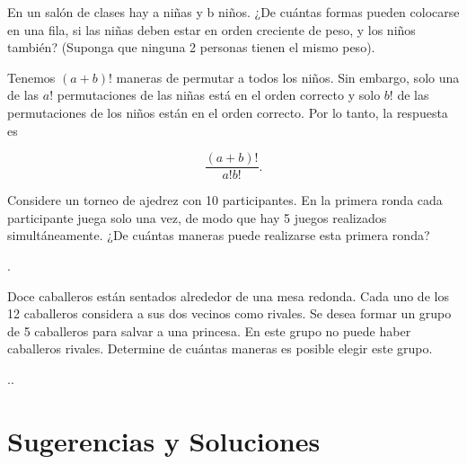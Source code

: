 \documentclass[11pt]{scrartcl}
\begin{document}
\begin{problem}
En un salón de clases hay a niñas y b niños. ¿De cuántas formas pueden colocarse en una fila, si las niñas deben estar en orden creciente de peso, y los niños también? (Suponga que ninguna 2 personas tienen el mismo peso).
\begin{hint}
Tenemos $(a + b)!$ maneras de permutar a todos los niños. Sin embargo, solo una de las $a!$ permutaciones de las niñas está en el orden correcto y solo $b!$ de las permutaciones de los niños están en el orden correcto. Por lo tanto, la respuesta es

\[
\frac{(a + b)!}{a!b!}.
\]

\end{hint}
\end{problem}

\begin{problem}
Considere un torneo de ajedrez con 10 participantes. En la primera ronda cada participante juega solo una vez, de modo que hay 5 juegos realizados simultáneamente. ¿De cuántas maneras puede realizarse esta primera ronda?
\begin{hint}
.
\end{hint}
\end{problem}

\begin{problem}
Doce caballeros están sentados alrededor de una mesa redonda. Cada uno de los 12 caballeros considera a sus dos vecinos como rivales. Se desea formar un grupo de 5 caballeros para salvar a una princesa. En este grupo no puede haber caballeros rivales. Determine de cuántas maneras es posible elegir este grupo.
\begin{hint}
..
\end{hint}
\end{problem}


\section{Sugerencias y Soluciones}
\begin{enumerate}

\end{enumerate}
\end{document}
